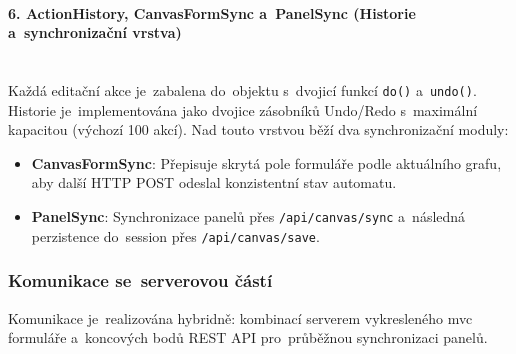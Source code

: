 \documentclass[
  master,
  program=ainfvs,
  printversion,
  figures=false,
  tables=false,
  glossaries,
  index
]{kidiplom}
\begin{document}
\paragraph{6. ActionHistory, CanvasFormSync a~PanelSync (Historie a~synchronizační vrstva)} \mbox{} \\
Každá editační akce je~zabalena do~objektu s~dvojicí funkcí \texttt{do()} a~\texttt{undo()}. Historie je~implementována jako dvojice zásobníků Undo/Redo s~maximální kapacitou (výchozí 100 akcí). Nad touto vrstvou běží dva synchronizační moduly:
\begin{itemize}
    \item \textbf{CanvasFormSync}: Přepisuje skrytá pole formuláře podle aktuálního grafu, aby další HTTP POST odeslal konzistentní stav automatu.
    \item \textbf{PanelSync}: Synchronizace panelů přes \texttt{/api/canvas/sync} a~následná perzistence do~session přes \texttt{/api/canvas/save}.
\end{itemize}

\subsubsection{Komunikace se~serverovou částí}
Komunikace je~realizována hybridně: kombinací serverem vykresleného \gls{mvc} formuláře a~koncových bodů REST API pro~průběžnou synchronizaci panelů.
\end{document}

